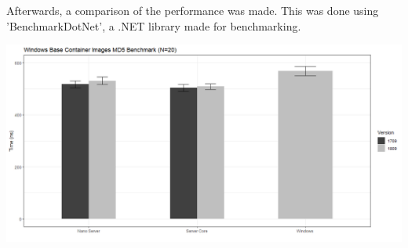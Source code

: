 \documentclass[a0,portrait]{a0poster}
\begin{document}
\begin{multicols}{2}
\begin{center}
\end{center}
Afterwards, a comparison of the performance was made. 
This was done using 'BenchmarkDotNet', a .NET library made for benchmarking.
\begin{center}
    \includegraphics[width=\linewidth]{../bachproef/img/Methodologie/Containers1}
\end{center}
\color{HoGentAccent1} 

\end{multicols}
\end{document}
